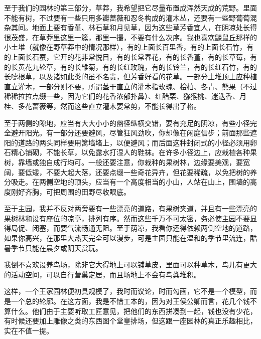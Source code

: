 \par 至于我们的园林的第三部分，草莽，我希望把它尽量布置成浑然天成的荒野。里面不能有树，不过要有一些只用多瓣蔷薇和忍冬构成的灌木丛，还要有一些野葡萄混杂其间。地面上要有香堇、林石草和月见草，因为这些草芳香宜人，在阴凉处长得很茂盛，在草莽里这里一簇，那里一撮，不要有什么次序。我也喜欢鼹鼠丘那样的小土堆（就像在野草莽中的情况那样），有的上面长百里香，有的上面长石竹，有的上面长石蚕，它开的花非常悦目，有的长常春花，有的长香堇，有的长草莓，有的长黄花九轮草，有的长雏菊，有的长红玫瑰，有的长铃兰，有的长红石竹，有的长嚏根草，以及诸如此类的虽不名贵，但芳香好看的花草。一部分土堆顶上应种植直立灌木，一部分则不要，所谓茎干直立的灌木指玫瑰、桧柏、冬青、熊果（不过稀稀拉拉点缀一些，因为它们的花香浓郁扑鼻）、红醋栗、猕猴桃、迷迭香、月桂、多花蔷薇等，然而这些直立灌木要常剪，不能长得出了格。
\par 至于两侧的隙地，应当有大大小小的幽径纵横交错，要有充足的阴凉，有些小径完全避开阳光。有一部分还要避风，尽管狂风劲吹，你却像在闲庭信步；前面那些遮阳的道路的两头同样要用篱墙堵上，以便避风；而后面这种封闭式的小径必须用卵石精心铺砌，不能长草，以免露水打湿人的鞋袜。在许多小径边上，应栽植各种果树，靠墙或独自成行均可。一般还要注意，你栽种的果树林，边缘要美观，要宽阔，要低矮，不要大起大落，还要点缀一些奇花异卉，但花要稀疏，以免把树的养分吸走。在两侧空地的顶头，应当有一个高度相当的小山，人站在山上，围墙的高度刚好齐胸，可把周围的田野尽收眼底。
\par 至于主园，我并不反对两旁要有一些漂亮的道路，有果树夹道，并且有一些漂亮的果树林和设有座位的凉亭，排列有序。然而这些千万不可太密，务必使主园不要显得局促、闭塞，而要气流畅通无阻。至于荫凉，我看你还得依赖两侧空地的道路，如果你高兴，在那里大热天完全可以漫步，可是主园只能在温和的季节里流连，酷暑季节只能在晨夕或阴天赏玩。
\par 我倒不喜欢设养鸟场，除非它大得地上可以铺草皮，里面可以种草木，鸟儿有更大的活动空间，可以自行营巢定居，而且场地上不会有鸟粪堆积。
\par 这样，一个王家园林便初具规模了，我时而议论，时而勾画，它不是一个模型，而是一个总的轮廓。在这方面，我是不惜工本的，因为对王侯公卿而言，花几个钱不算什么。他们由于主要听取工匠意见，把他们的东西拼凑到一起，钱也没有少花，有时候还要加上雕像之类的东西图个堂皇排场，但这跟一座园林的真正乐趣相比，实在不值一提。
 



